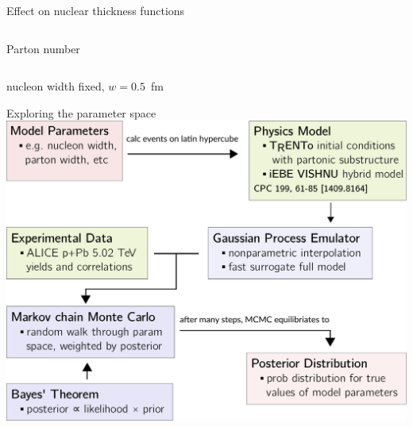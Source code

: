 \documentclass[aspectratio=43]{beamer}
\theoremstyle{definition}
\begin{document}
\begin{frame}{Effect on nuclear thickness functions}
\begin{columns}
\begin{column}{.49\textwidth}
      \small Parton number
    \end{column}
  \end{columns}
  \vspace{.75 cm}
  \centering
  \small nucleon width fixed, $w = 0.5$~fm
\end{frame}

\begin{frame}{Exploring the parameter space}
  \centering
  \medskip
  \includegraphics[width=.95\textwidth]{flowchart} \\
\end{frame}
\end{document}
